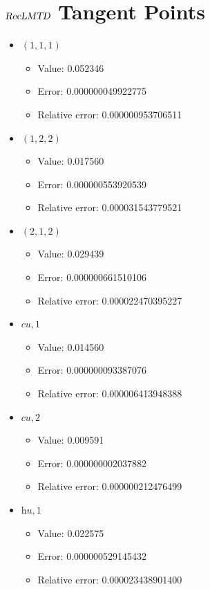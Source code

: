 \documentclass{article}%
\begin{document}
\section{$\textsl{RecLMTD}$ Tangent Points}%
\thispagestyle{plain}%
\begin{itemize}%
	\item $(1, 1, 1)$%
	\begin{itemize}%
		\item Value: 0.052346%
		\item Error: 0.000000049922775%
		\item Relative error: 0.000000953706511%
	\end{itemize}%
	\item $(1, 2, 2)$%
	\begin{itemize}%
		\item Value: 0.017560%
		\item Error: 0.000000553920539%
		\item Relative error: 0.000031543779521%
	\end{itemize}%
	\item $(2, 1, 2)$%
	\begin{itemize}%
		\item Value: 0.029439%
		\item Error: 0.000000661510106%
		\item Relative error: 0.000022470395227%
	\end{itemize}%
	\item $\textit{cu},1$%
	\begin{itemize}%
		\item Value: 0.014560%
		\item Error: 0.000000093387076%
		\item Relative error: 0.000006413948388%
	\end{itemize}%
	\item $\textit{cu},2$%
	\begin{itemize}%
		\item Value: 0.009591%
		\item Error: 0.000000002037882%
		\item Relative error: 0.000000212476499%
	\end{itemize}%
	\item $\textit{hu},1$%
	\begin{itemize}%
		\item Value: 0.022575%
		\item Error: 0.000000529145432%
		\item Relative error: 0.000023438901400%
	\end{itemize}%
\end{itemize}%
\end{document}
